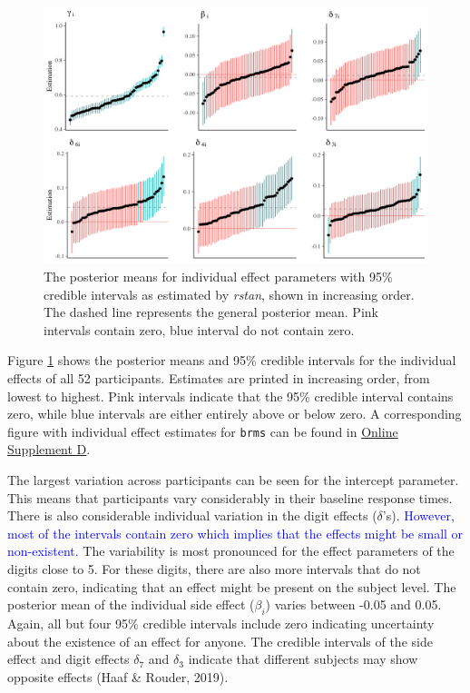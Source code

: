 \documentclass[
  english,
  doc,floatsintext]{apa6}
\begin{document}
\begin{figure}[H]

\includegraphics[width=1\linewidth]{I - Images/Fig11_randompar_v2} \hfill{}

\caption{The posterior means for individual effect parameters with 95\% credible intervals as estimated by \textit{rstan}, shown in increasing order. The dashed line represents the general posterior mean. Pink intervals contain zero, blue interval do not contain zero.}\label{fig:randomparfigure}
\end{figure}

Figure \ref{fig:randomparfigure} shows the posterior means and 95\% credible intervals for the individual effects of all 52 participants. Estimates are printed in increasing order, from lowest to highest. Pink intervals indicate that the 95\% credible interval contains zero, while blue intervals are either entirely above or below zero. A corresponding figure with individual effect estimates for \texttt{brms} can be found in \href{https://github.com/MyrtheV/Bayesian-Hierarchical-Modelling-An-Introduction-and-Reassessment/blob/main/D\%20-\%20Tutorial\%20Normal\%20Model\%20brms/Online-Supplement-D---Bayesian-Hierarchical-Modeling-in-brms.pdf}{Online Supplement D}.

The largest variation across participants can be seen for the intercept parameter. This means that participants vary considerably in their baseline response times. There is also considerable individual variation in the digit effects (\(\delta\)'s). \textcolor{blue}{However, most of the intervals contain zero which implies that the effects might be small or non-existent.} The variability is most pronounced for the effect parameters of the digits close to 5. For these digits, there are also more intervals that do not contain zero, indicating that an effect might be present on the subject level. The posterior mean of the individual side effect (\(\beta_{i}\)) varies between -0.05 and 0.05. Again, all but four 95\% credible intervals include zero indicating uncertainty about the existence of an effect for anyone. The credible intervals of the side effect and digit effects \(\delta_{7}\) and \(\delta_{3}\) indicate that different subjects may show opposite effects (Haaf \& Rouder, 2019).
\end{document}
